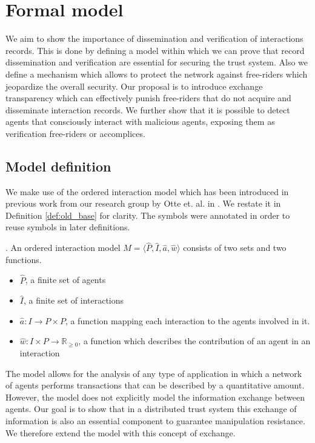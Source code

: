\chapter{Formal model}
\label{chap:model}
We aim to show the importance of dissemination and verification of interactions 
records. This is done by defining a model within which we can prove that record
dissemination and verification are essential for securing the trust system. Also we define a
mechanism which allows to protect the network against free-riders which 
jeopardize the overall security. Our proposal is to introduce exchange transparency which can 
effectively punish free-riders that do not acquire and disseminate interaction records. We further 
show that it is possible to detect agents that consciously interact with malicious agents, exposing
them as verification free-riders or accomplices.

\section{Model definition}
\label{sec:definitions}
We make use of the ordered interaction model which has been introduced in previous work from 
our research group by Otte et. al. in \cite{OTTE2017}. We restate it in Definition \ref{def:old_base} for clarity.
The symbols were annotated in order to reuse symbols in later definitions.

\begin{defn}. 
    \label{def:old_base}
    An ordered interaction model $\hat M = \langle \hat P, \hat I, \hat a, \hat w \rangle$ consists of two sets and two 
    functions.
    \begin{itemize}
        \item $\hat P$, a finite set of agents
        \item $\hat I$, a finite set of interactions
        \item $\hat a : I \rightarrow P \times P$, a function mapping each interaction to the agents 
        involved in it.
        \item $\hat w : I \times P \rightarrow \mathbb{R}_{\geq0}$, a function which describes the 
        contribution of an agent in an interaction
    \end{itemize}
\end{defn}

The model allows for the analysis of any type of application in which a network of agents performs
transactions that can be described by a quantitative amount. However, the model does not explicitly
model the information exchange between agents. Our goal is to show that in a distributed trust system this 
exchange of information is also an essential component to guarantee manipulation resistance. We 
therefore extend the model with this concept of exchange.

